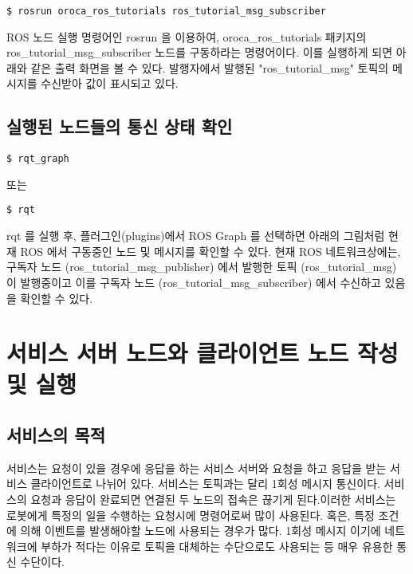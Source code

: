 \begin{lstlisting}[language=ROS]
$ rosrun oroca_ros_tutorials ros_tutorial_msg_subscriber 
\end{lstlisting}

ROS 노드 실행 명령어인 rosrun 을 이용하여, oroca\_ros\_tutorials 패키지의 ros\_tutorial\_msg\_subscriber  노드를 구동하라는 명령어이다. 이를 실행하게 되면 아래와 같은 출력 화면을 볼 수 있다. 발행자에서 발행된 "ros\_tutorial\_msg" 토픽의 메시지를 수신받아 값이 표시되고 있다.

\subsection{실행된 노드들의 통신 상태 확인}

\begin{lstlisting}[language=ROS]
$ rqt_graph
\end{lstlisting}
또는

\begin{lstlisting}[language=ROS]
$ rqt
\end{lstlisting}

rqt 를 실행 후, 플러그인(plugins)에서 ROS Graph 를 선택하면 아래의 그림처럼 현재 ROS 에서 구동중인 노드 및 메시지를 확인할 수 있다. 현재 ROS 네트워크상에는, 구독자 노드 (ros\_tutorial\_msg\_publisher) 에서 발행한 토픽 (ros\_tutorial\_msg) 이 발행중이고 이를 구독자 노드 (ros\_tutorial\_msg\_subscriber) 에서 수신하고 있음을 확인할 수 있다.


\section{서비스 서버 노드와 클라이언트 노드 작성 및 실행}

\subsection{서비스의 목적}

서비스는 요청이 있을 경우에 응답을 하는 서비스 서버와 요청을 하고 응답을 받는 서비스 클라이언트로 나뉘어 있다. 서비스는 토픽과는 달리 1회성 메시지 통신이다. 서비스의 요청과 응답이 완료되면 연결된 두 노드의 접속은 끊기게 된다.이러한 서비스는 로봇에게 특정의 일을 수행하는 요청시에 명령어로써 많이 사용된다. 혹은, 특정 조건에 의해 이벤트를 발생해야할 노드에 사용되는 경우가 많다. 1회성 메시지 이기에 네트워크에 부하가 적다는 이유로 토픽을 대체하는 수단으로도 사용되는 등 매우 유용한 통신 수단이다.

